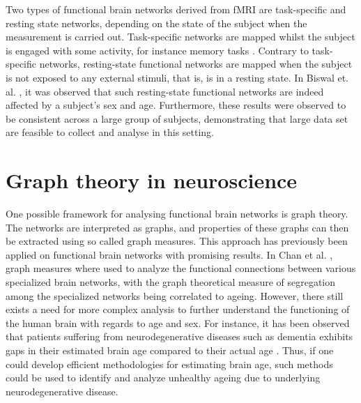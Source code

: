 Two types of functional brain networks derived from fMRI are task-specific and resting state networks, depending on the state of the subject when the measurement is carried out. Task-specific networks are mapped whilst the subject is engaged with some activity, for instance memory tasks \cite{grady}. Contrary to task-specific networks, resting-state functional networks are mapped when the subject is not exposed to any external stimuli, that is, is in a resting state. In Biswal et. al. \cite{biswal}, it was observed that such resting-state functional networks are indeed affected by a subject's sex and age. Furthermore, these results were observed to be consistent across a large group of subjects, demonstrating that large data set are feasible to collect and analyse in this setting.

\section{Graph theory in neuroscience}

One possible framework for analysing functional brain networks is graph theory. The networks are interpreted as graphs, and properties of these graphs can then be extracted using so called graph measures. This approach has previously been applied on functional brain networks with promising results. In Chan et al. \cite{chan}, graph measures where used to analyze the functional connections between various specialized brain networks, with the graph theoretical measure of segregation among the specialized networks being correlated to ageing. However, there still exists a need for more complex analysis to further understand the functioning of the human brain with regards to age and sex. For instance, it has been observed that patients suffering from neurodegenerative diseases such as dementia exhibits gaps in their estimated brain age compared to their actual age \cite{kaufmann}. Thus, if one could develop efficient methodologies for estimating brain age, such methods could be used to identify and analyze unhealthy ageing due to underlying neurodegenerative disease. 


